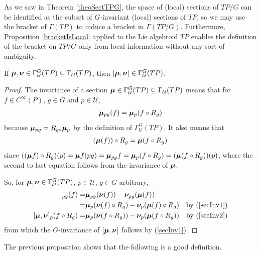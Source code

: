 As we saw in Theorem \ref{theoSectTPG}, the space of (local) sections of $TP/G$ can be identified as the subset of $G$-invariant (local) sections of $TP$, so we may use the bracket of $\Gamma(TP)$ to induce a bracket in $\Gamma(TP/G)$. Furthermore, Proposition \ref{bracketIsLocal} applied to the Lie algebroid $TP$ enables the definition of the bracket on $TP/G$ only from local information without any sort of ambiguity.

\begin{lemma}
If $\bm{\mu}, \bm{\nu} \in \Gamma_{\mathcal U}^G(TP) \subseteq \Gamma_{\mathcal U}(TP)$, then $[\bm{\mu}, \bm{\nu}] \in \Gamma_{\mathcal U}^G(TP)$.
\end{lemma}

\begin{proof}
The invariance of a section $\bm{\mu} \in \Gamma_{\mathcal U}^G(TP) \subseteq \Gamma_{\mathcal U}(TP)$ means that for $f \in C^\infty(P)$, $g \in G$ and $p \in \mathcal U$,  
\begin{align} \label{secInv1}
\bm{\mu}_{pg} (f) = \bm{\mu}_p(f \circ R_g)\end{align} 
because $\bm{\mu}_{pg} = R_{g*} \bm{\mu}_p$ by the definition of $\Gamma_{\mathcal U}^G(TP)$. It also means that 
\begin{align}\label{secInv2}
(\bm{\mu} (f)) \circ R_g = \bm{\mu}(f \circ R_g)
\end{align}
since $((\bm{\mu} f) \circ R_g)(p) = \bm{\mu} f(pg) = \bm{\mu}_{pg} f = \bm{\mu}_p(f \circ R_g) = (\bm{\mu}(f \circ R_g))(p)$, where the second to last equation follows from the invariance of $\bm{\mu}$.
    
So, for $\bm{\mu}, \bm{\nu} \in \Gamma_{\mathcal U}^G(TP)$, $p \in \mathcal U$, $g \in G$ arbitrary,
\begin{align*}
    [\sect \mu, \sect \nu]_{pg}(f)
        =& \sect \mu_{pg}(\sect \nu(f)) - \sect \nu_{pg}(\sect \mu (f))\\
        =& \sect \mu_{p}(\sect \nu(f) \circ R_g) - \sect \nu_{p}(\sect \mu (f) \circ R_g) & \textrm{by } (\ref{secInv1})\\
    [\sect \mu, \sect \nu]_p (f \circ R_g) =& \sect \mu_p(\sect \nu(f \circ R_g)) - \sect \nu_p(\sect \mu(f \circ R_g)) & \textrm{by } (\ref{secInv2})
\end{align*}
from which the $G$-invariance of $[\bm{\mu}, \bm{\nu}]$ follows by (\ref{secInv1}).
\end{proof}

The previous proposition shows that the following is a good definition.

